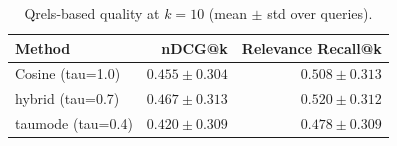 \begin{table}[h]
\centering
\caption{Qrels-based quality at $k=10$ (mean $\pm$ std over queries).}
\begin{tabular}{lrr}
\toprule
Method & nDCG@k & Relevance Recall@k \\
\midrule
Cosine (tau=1.0) & $0.455\pm0.304$ & $0.508\pm0.313$ \\
hybrid (tau=0.7) & $\mathbf{0.467\pm0.313}$ & $\mathbf{0.520\pm0.312}$ \\
taumode (tau=0.4) & $0.420\pm0.309$ & $0.478\pm0.309$ \\
\bottomrule
\end{tabular}
\end{table}
